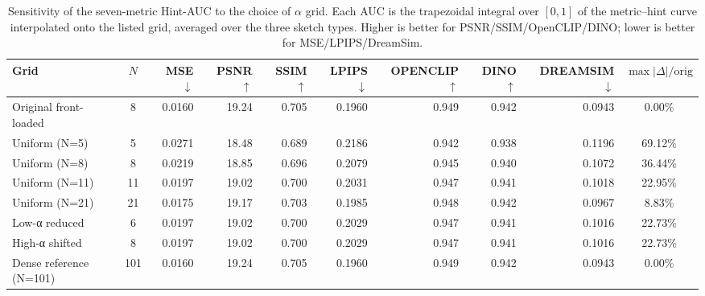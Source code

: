 \begin{table}[t]
  \centering
  \caption{Sensitivity of the seven-metric Hint-AUC to the choice of $\alpha$ grid. Each AUC is the trapezoidal integral over $[0,1]$ of the metric--hint curve interpolated onto the listed grid, averaged over the three sketch types. Higher is better for PSNR/SSIM/OpenCLIP/DINO; lower is better for MSE/LPIPS/DreamSim.}
  \label{tab:S-R2-1-B-2-7m}
  \small
  \begin{tabular}{l c rrrrrrr c}
    \toprule
    Grid & $N$ & MSE $\downarrow$ & PSNR $\uparrow$ & SSIM $\uparrow$ & LPIPS $\downarrow$ & OPENCLIP $\uparrow$ & DINO $\uparrow$ & DREAMSIM $\downarrow$ & $\max\!\big|\Delta\big|/\mathrm{orig}$ \\
    \midrule
    Original front-loaded      &   8 & 0.0160 & 19.24 & 0.705 & 0.1960 & 0.949 & 0.942 & 0.0943 &  0.00\% \\
    Uniform (N=5)              &   5 & 0.0271 & 18.48 & 0.689 & 0.2186 & 0.942 & 0.938 & 0.1196 & 69.12\% \\
    Uniform (N=8)              &   8 & 0.0219 & 18.85 & 0.696 & 0.2079 & 0.945 & 0.940 & 0.1072 & 36.44\% \\
    Uniform (N=11)             &  11 & 0.0197 & 19.02 & 0.700 & 0.2031 & 0.947 & 0.941 & 0.1018 & 22.95\% \\
    Uniform (N=21)             &  21 & 0.0175 & 19.17 & 0.703 & 0.1985 & 0.948 & 0.942 & 0.0967 &  8.83\% \\
    Low-α reduced              &   6 & 0.0197 & 19.02 & 0.700 & 0.2029 & 0.947 & 0.941 & 0.1016 & 22.73\% \\
    High-α shifted             &   8 & 0.0197 & 19.02 & 0.700 & 0.2029 & 0.947 & 0.941 & 0.1016 & 22.73\% \\
    Dense reference (N=101)    & 101 & 0.0160 & 19.24 & 0.705 & 0.1960 & 0.949 & 0.942 & 0.0943 &  0.00\% \\
    \bottomrule
  \end{tabular}
\end{table}
